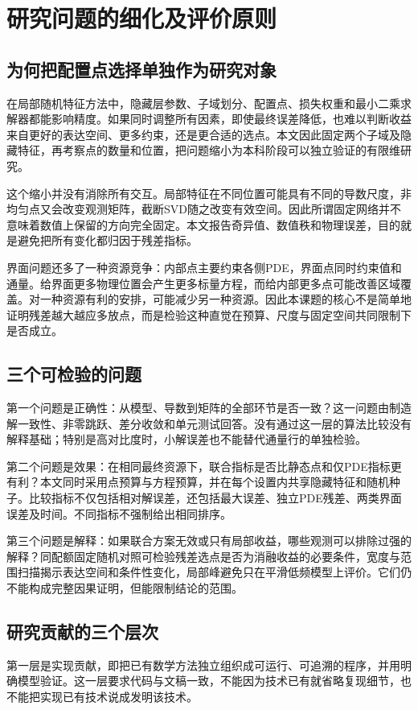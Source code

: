 \section{研究问题的细化及评价原则}
\subsection{为何把配置点选择单独作为研究对象}
在局部随机特征方法中，隐藏层参数、子域划分、配置点、损失权重和最小二乘求解器都能影响精度。如果同时调整所有因素，即使最终误差降低，也难以判断收益来自更好的表达空间、更多约束，还是更合适的选点。本文因此固定两个子域及隐藏特征，再考察点的数量和位置，把问题缩小为本科阶段可以独立验证的有限维研究。

这个缩小并没有消除所有交互。局部特征在不同位置可能具有不同的导数尺度，非均匀点又会改变观测矩阵，截断SVD随之改变有效空间。因此所谓固定网络并不意味着数值上保留的方向完全固定。本文报告奇异值、数值秩和物理误差，目的就是避免把所有变化都归因于残差指标。

界面问题还多了一种资源竞争：内部点主要约束各侧PDE，界面点同时约束值和通量。给界面更多物理位置会产生更多标量方程，而给内部更多点可能改善区域覆盖。对一种资源有利的安排，可能减少另一种资源。因此本课题的核心不是简单地证明残差越大越应多放点，而是检验这种直觉在预算、尺度与固定空间共同限制下是否成立。

\subsection{三个可检验的问题}
第一个问题是正确性：从模型、导数到矩阵的全部环节是否一致？这一问题由制造解一致性、非零跳跃、差分收敛和单元测试回答。没有通过这一层的算法比较没有解释基础；特别是高对比度时，小解误差也不能替代通量行的单独检验。

第二个问题是效果：在相同最终资源下，联合指标是否比静态点和仅PDE指标更有利？本文同时采用点预算与方程预算，并在每个设置内共享隐藏特征和随机种子。比较指标不仅包括相对解误差，还包括最大误差、独立PDE残差、两类界面误差及时间。不同指标不强制给出相同排序。

第三个问题是解释：如果联合方案无效或只有局部收益，哪些观测可以排除过强的解释？同配额固定随机对照可检验残差选点是否为消融收益的必要条件，宽度与范围扫描揭示表达空间和条件性变化，局部峰避免只在平滑低频模型上评价。它们仍不能构成完整因果证明，但能限制结论的范围。

\subsection{研究贡献的三个层次}
第一层是实现贡献，即把已有数学方法独立组织成可运行、可追溯的程序，并用明确模型验证。这一层要求代码与文稿一致，不能因为技术已有就省略复现细节，也不能把实现已有技术说成发明该技术。

